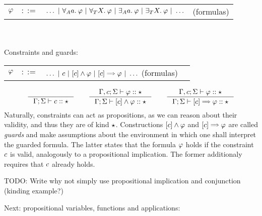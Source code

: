\documentclass[english, mgr]{iithesis}
\renewcommand{\it}[1]{\textit{#1}}
\begin{document}
\begin{tabular}{rrlr}
$\varphi$ & $::=$ & $\ldots
               \ |\  \forall_A a .\: \varphi
               \ |\  \forall_T X .\: \varphi
               \ |\  \exists_A a .\: \varphi
               \ |\  \exists_T X .\: \varphi
               \ |\  \ldots$
    & (formulas)
\end{tabular}
\\ \\
Constraints and guards:

\begin{tabular}{rrlr}
$\varphi$ & $::=$ & $\ldots
               \bnfor \fConstr{\constr}
               \bnfor \fCAnd{\constr} \formphi
               \bnfor \fCImp{\constr} \formphi
               \bnfor \ldots$  (formulas)
\end{tabular}
$$
\inference{
}{
  \cEnv; \kEnv \vdash \fConstr{\constr} \ofkind \kProp
}
\qquad
\inference{
  \cEnv,\constr; \kEnv \vdash \formphi \ofkind \kProp
}{
  \cEnv; \kEnv \vdash \fCAnd{\constr} \formphi \ofkind \kProp
}
\qquad
\inference{
  \cEnv,\constr; \kEnv \vdash \formphi \ofkind \kProp
}{
  \cEnv; \kEnv \vdash \fCImp{\constr} \formphi \ofkind \kProp
}
$$
Naturally, constraints can act as propositions, as we can reason about their
validity, and thus they are of kind $\star$.
Constructions $[c]\wedge \varphi$ and $\fCImp{\constr} \formphi$
are called \it{guards} and make assumptions about the environment in which
one shall interpret the guarded formula.
The latter states that the formula $\varphi$ holds if the constraint $c$ is valid,
analogously to a propositional implication.
The former additionaly requires that $c$ already holds.

TODO: Write why not simply use propositional implication and conjunction (kinding example?)

Next: propositional variables, functions and applications:
\end{document}

